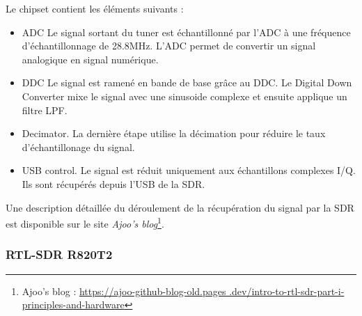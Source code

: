 \vspace{0.1cm}

Le chipset contient les éléments suivants :
\begin{itemize}
\item \ac{ADC} Le signal sortant du tuner est échantillonné par l'ADC à une fréquence d'échantillonnage de 28.8MHz. L'\ac{ADC} permet de convertir un signal analogique en signal numérique.
\item \ac{DDC} Le signal est ramené en bande de base grâce au DDC. Le Digital Down Converter  mixe le signal avec une sinusoide complexe et ensuite applique un filtre \ac{LPF}. 
\item Decimator. La dernière étape utilise la décimation pour réduire le taux d'échantillonage du signal.
\item \ac{USB} control. Le signal est réduit uniquement aux échantillons complexes \ac{I/Q}. Ils sont récupérés depuis l'\ac{USB} de la \ac{SDR}.
\end{itemize}

\vspace{0.1cm}

Une description détaillée du déroulement de la récupération du signal par la \ac{SDR} est disponible sur le site \textit{Ajoo's blog}\footnote{Ajoo's blog : \href{https://ajoo-github-blog-old.pages.dev/intro-to-rtl-sdr-part-i-principles-and-hardware}{https://ajoo-github-blog-old.pages
.dev/intro-to-rtl-sdr-part-i-principles-and-hardware}}.




\subsubsection{RTL-SDR R820T2}

